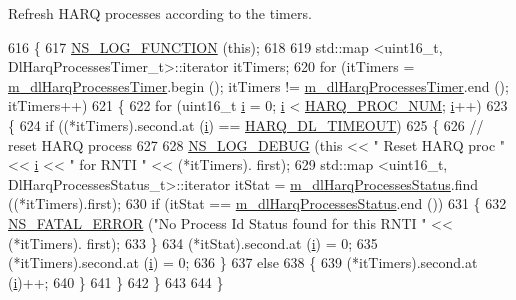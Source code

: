 Refresh H\+A\+RQ processes according to the timers. 


\begin{DoxyCode}
616 \{
617   \hyperlink{log-macros-disabled_8h_a90b90d5bad1f39cb1b64923ea94c0761}{NS\_LOG\_FUNCTION} (\textcolor{keyword}{this});
618 
619   std::map <uint16\_t, DlHarqProcessesTimer\_t>::iterator itTimers;
620   \textcolor{keywordflow}{for} (itTimers = \hyperlink{classns3_1_1PfFfMacScheduler_ab115ef9abb936f35aeb5979a8ed8928d}{m\_dlHarqProcessesTimer}.begin (); itTimers != 
      \hyperlink{classns3_1_1PfFfMacScheduler_ab115ef9abb936f35aeb5979a8ed8928d}{m\_dlHarqProcessesTimer}.end (); itTimers++)
621     \{
622       \textcolor{keywordflow}{for} (uint16\_t \hyperlink{bernuolliDistribution_8m_a6f6ccfcf58b31cb6412107d9d5281426}{i} = 0; \hyperlink{bernuolliDistribution_8m_a6f6ccfcf58b31cb6412107d9d5281426}{i} < \hyperlink{cqa-ff-mac-scheduler_8h_a9185d8d7d2b2979181d4a7044a3d3555}{HARQ\_PROC\_NUM}; \hyperlink{bernuolliDistribution_8m_a6f6ccfcf58b31cb6412107d9d5281426}{i}++)
623         \{
624           \textcolor{keywordflow}{if} ((*itTimers).second.at (\hyperlink{bernuolliDistribution_8m_a6f6ccfcf58b31cb6412107d9d5281426}{i}) == \hyperlink{cqa-ff-mac-scheduler_8h_add9e0c4889dc1b5b25686480b31ad166}{HARQ\_DL\_TIMEOUT})
625             \{
626               \textcolor{comment}{// reset HARQ process}
627 
628               \hyperlink{group__logging_ga413f1886406d49f59a6a0a89b77b4d0a}{NS\_LOG\_DEBUG} (\textcolor{keyword}{this} << \textcolor{stringliteral}{" Reset HARQ proc "} << \hyperlink{bernuolliDistribution_8m_a6f6ccfcf58b31cb6412107d9d5281426}{i} << \textcolor{stringliteral}{" for RNTI "} << (*itTimers).
      first);
629               std::map <uint16\_t, DlHarqProcessesStatus\_t>::iterator itStat = 
      \hyperlink{classns3_1_1PfFfMacScheduler_a438c2319e01eaac65f64cbd82b3e8089}{m\_dlHarqProcessesStatus}.find ((*itTimers).first);
630               \textcolor{keywordflow}{if} (itStat == \hyperlink{classns3_1_1PfFfMacScheduler_a438c2319e01eaac65f64cbd82b3e8089}{m\_dlHarqProcessesStatus}.end ())
631                 \{
632                   \hyperlink{group__fatal_ga5131d5e3f75d7d4cbfd706ac456fdc85}{NS\_FATAL\_ERROR} (\textcolor{stringliteral}{"No Process Id Status found for this RNTI "} << (*itTimers).
      first);
633                 \}
634               (*itStat).second.at (\hyperlink{bernuolliDistribution_8m_a6f6ccfcf58b31cb6412107d9d5281426}{i}) = 0;
635               (*itTimers).second.at (\hyperlink{bernuolliDistribution_8m_a6f6ccfcf58b31cb6412107d9d5281426}{i}) = 0;
636             \}
637           \textcolor{keywordflow}{else}
638             \{
639               (*itTimers).second.at (\hyperlink{bernuolliDistribution_8m_a6f6ccfcf58b31cb6412107d9d5281426}{i})++;
640             \}
641         \}
642     \}
643 
644 \}
\end{DoxyCode}


